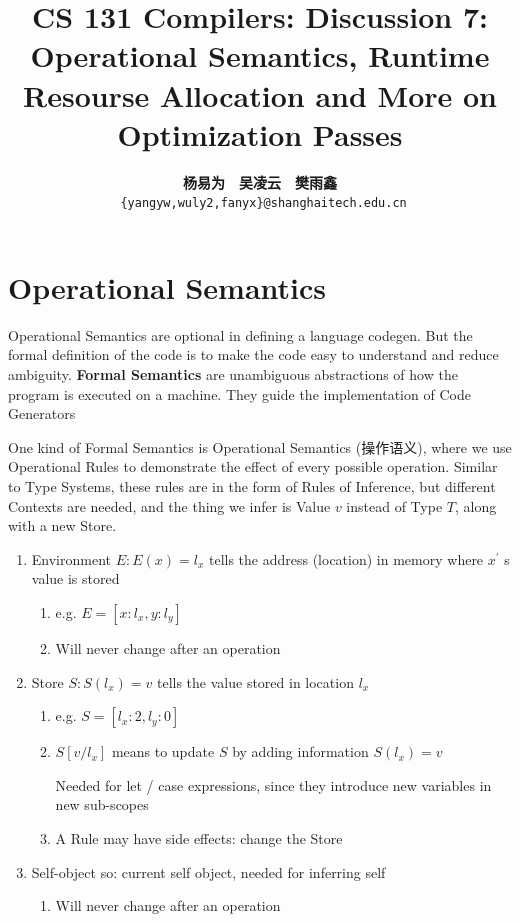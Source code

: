 \documentclass[a4paper]{exam}
\title{CS 131 Compilers: Discussion 7: Operational Semantics, Runtime Resourse Allocation and More on Optimization Passes}
\author{\textbf{杨易为}~~\textbf{吴凌云}~~\textbf{樊雨鑫} \\ \texttt{ \{yangyw,wuly2,fanyx\}@shanghaitech.edu.cn}}
\theoremstyle{definition}
\begin{document}
\maketitle
\section{Operational Semantics}
Operational Semantics are optional in defining a language codegen. But the formal definition of the code is to make the code easy to understand and reduce ambiguity. \textbf{Formal Semantics} are unambiguous abstractions of how the program is executed on a machine. They guide the implementation of Code Generators

One kind of Formal Semantics is Operational Semantics (操作语义), where we use Operational Rules to demonstrate the effect of every possible operation. Similar to Type Systems, these rules are in the form of Rules of Inference, but different Contexts are needed, and the thing we infer is Value $v$ instead of Type $T$, along with a new Store.

\begin{enumerate}
    \item  Environment $E: E(x)=l_{x}$ tells the address (location) in memory where $x^{\prime}$ s value is stored
    \begin{enumerate}
        \item e.g. $E=\left[x: l_{x}, y: l_{y}\right]$
        \item Will never change after an operation
    \end{enumerate}
\item Store $S: S\left(l_{x}\right)=v$ tells the value stored in location $l_{x}$
\begin{enumerate}
    \item e.g. $S=\left[l_{x}: 2, l_{y}: 0\right]$
    \item $S\left[v / l_{x}\right]$ means to update $S$ by adding information $S\left(l_{x}\right)=v$
     
     Needed for let / case expressions, since they introduce new variables in new sub-scopes
     \item A Rule may have side effects: change the Store
\end{enumerate}
\item Self-object so: current self object, needed for inferring self
\begin{enumerate}
\item Will never change after an operation
\end{enumerate}

\end{enumerate}
\end{document}
